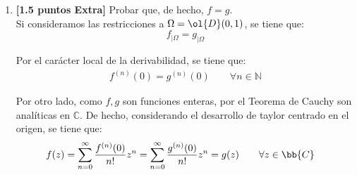 \documentclass[12pt]{article}
\begin{document}
\begin{ejercicio}
\begin{enumerate}
            \item \textbf{[1.5 puntos Extra]} Probar que, de hecho, $f = g$.\\
            
            Si consideramos las restricciones a $\Omega=\ol{D}(0,1)$, se tiene que:
            \begin{equation*}
                f_{\big| \Omega} = g_{\big| \Omega}
            \end{equation*}

            Por el carácter local de la derivabilidad, se tiene que:
            \begin{align*}
                f^{(n)}(0) = g^{(n)}(0) \qquad \forall n\in \mathbb{N}
            \end{align*}

            Por otro lado, como $f,g$ son funciones enteras, por el Teorema de Cauchy son analíticas en $\mathbb{C}$. De hecho, considerando el desarrollo de taylor centrado en el origen, se tiene que:
            \begin{align*}
                f(z) &= \sum_{n=0}^{\infty} \frac{f^{(n)}(0)}{n!} z^n = \sum_{n=0}^{\infty} \frac{g^{(n)}(0)}{n!} z^n = g(z)\qquad \forall z\in \bb{C}
            \end{align*}
        \end{enumerate}
    \end{ejercicio}
\end{document}
